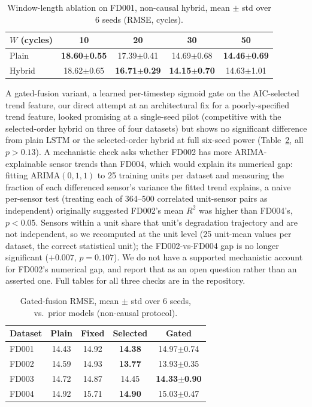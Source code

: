 \documentclass[conference]{IEEEtran}
\begin{document}
\begin{table}[t]
\centering
\caption{Window-length ablation on FD001, non-causal hybrid, mean $\pm$ std over 6 seeds (RMSE, cycles).}
\label{tab:ablation}
\footnotesize
\setlength{\tabcolsep}{3pt}
\begin{tabular}{lcccc}
\toprule
$W$ (cycles) & 10 & 20 & 30 & 50 \\
\midrule
Plain & \textbf{18.60{\tiny$\pm$0.55}} & 17.39{\tiny$\pm$0.41} & 14.69{\tiny$\pm$0.68} & \textbf{14.46{\tiny$\pm$0.69}} \\
Hybrid & 18.62{\tiny$\pm$0.65} & \textbf{16.71{\tiny$\pm$0.29}} & \textbf{14.15{\tiny$\pm$0.70}} & 14.63{\tiny$\pm$1.01} \\
\bottomrule
\end{tabular}
\end{table} A gated-fusion variant, a learned per-timestep sigmoid gate on the AIC-selected trend feature, our direct attempt at an architectural fix for a poorly-specified trend feature, looked promising at a single-seed pilot (competitive with the selected-order hybrid on three of four datasets) but shows no significant difference from plain LSTM or the selected-order hybrid at full six-seed power (Table~\ref{tab:gated}, all $p>0.13$). A mechanistic check asks whether FD002 has more ARIMA-explainable sensor trends than FD004, which would explain its numerical gap: fitting ARIMA$(0,1,1)$ to 25 training units per dataset and measuring the fraction of each differenced sensor's variance the fitted trend explains, a naive per-sensor test (treating each of 364--500 correlated unit-sensor pairs as independent) originally suggested FD002's mean $R^2$ was higher than FD004's, $p<0.05$. Sensors within a unit share that unit's degradation trajectory and are not independent, so we recomputed at the unit level (25 unit-mean values per dataset, the correct statistical unit); the FD002-vs-FD004 gap is no longer significant ($+0.007$, $p=0.107$). We do not have a supported mechanistic account for FD002's numerical gap, and report that as an open question rather than an asserted one. Full tables for all three checks are in the repository.

\begin{table}[t]
\centering
\caption{Gated-fusion RMSE, mean $\pm$ std over 6 seeds, vs.\ prior models (non-causal protocol).}
\label{tab:gated}
\footnotesize
\begin{tabular}{lcccc}
\toprule
Dataset & Plain & Fixed & Selected & Gated \\
\midrule
FD001 & 14.43 & 14.92 & \textbf{14.38} & 14.97{\tiny$\pm$0.74} \\
FD002 & 14.59 & 14.93 & \textbf{13.77} & 13.93{\tiny$\pm$0.35} \\
FD003 & 14.72 & 14.87 & 14.45 & \textbf{14.33{\tiny$\pm$0.90}} \\
FD004 & 14.92 & 15.71 & \textbf{14.90} & 15.03{\tiny$\pm$0.47} \\
\bottomrule
\end{tabular}
\end{table}
\end{document}
